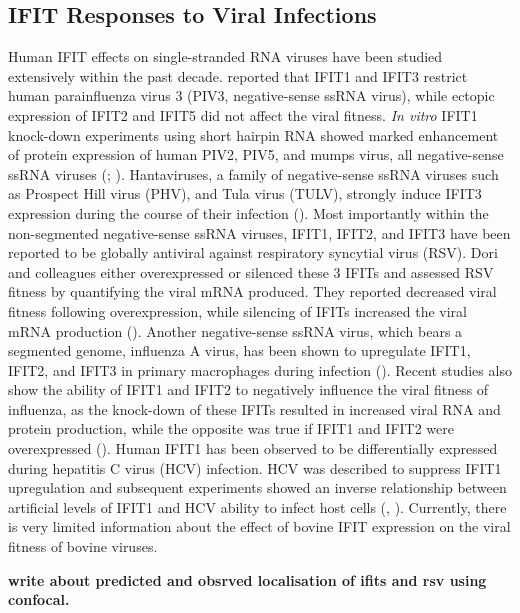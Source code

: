 \subsection{IFIT Responses to Viral Infections} \label{subsec:IFIT Responses to Viral Infections}
Human IFIT effects on single-stranded RNA viruses have been studied extensively within the past decade. \cite{Rabbani2016Identification3} reported that IFIT1 and IFIT3 restrict human parainfluenza virus 3 (PIV3, negative-sense ssRNA virus), while ectopic expression of IFIT2 and IFIT5 did not affect the viral fitness. \textit{In vitro} IFIT1 knock-down experiments using short hairpin RNA showed marked enhancement of protein expression of human PIV2, PIV5, and mumps virus, all negative-sense ssRNA viruses (\cite{Andrejeva2013ISG56/IFIT1Synthesis}; \cite{Young2016HumanFamily}). Hantaviruses, a family of negative-sense ssRNA viruses such as Prospect Hill virus (PHV), and Tula virus (TULV), strongly induce IFIT3 expression during the course of their infection (\cite{Matthys2011TheInduction}). Most importantly within the non-segmented negative-sense ssRNA viruses, IFIT1, IFIT2, and IFIT3 have been reported to be globally antiviral against respiratory syncytial virus (RSV). Dori and colleagues either overexpressed or silenced these 3 IFITs and assessed RSV fitness by quantifying the viral mRNA produced. They reported decreased viral fitness following overexpression, while silencing of IFITs increased the viral mRNA production (\cite{Drori2020InfluenzaProteins}). Another negative-sense ssRNA virus, which bears a segmented genome, influenza A virus, has been shown to upregulate IFIT1, IFIT2, and IFIT3 in primary macrophages during infection (\cite{Lietzen2011QuantitativeMacrophages}). Recent studies also show the ability of IFIT1 and IFIT2 to negatively influence the viral fitness of influenza, as the knock-down of these IFITs resulted in increased viral RNA and protein production, while the opposite was true if IFIT1 and IFIT2 were overexpressed (\cite{Zhu2023TheSynthesis}). Human IFIT1 has been observed to be differentially expressed during hepatitis C virus (HCV) infection. HCV was described to suppress IFIT1 upregulation and subsequent experiments showed an inverse relationship between artificial levels of IFIT1 and HCV ability to infect host cells (\cite{Raychoudhuri2011ISG56Replication}, \cite{Ishida2019HepaticInfection}). Currently, there is very limited information about the effect of bovine IFIT expression on the viral fitness of bovine viruses.

\textbf{write about predicted and obsrved localisation of ifits and rsv using confocal.}

